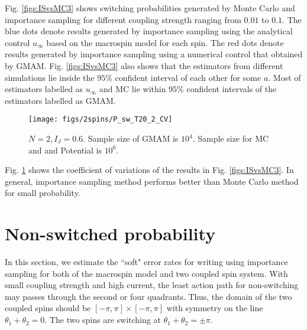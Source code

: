\documentclass[journal,transmag]{IEEEtran}
\begin{document}
Fig. \ref{figs:ISvsMC3} shows switching probabilities generated by Monte Carlo and importance sampling for different coupling strength ranging from $0.01$ to $0.1$. The blue dots denote results generated by importance sampling using the analytical control $u_{\infty}$  based on the macrospin model for each spin. The red dots denote results generated by importance sampling using a numerical control that obtained by GMAM.
 Fig. \ref{figs:ISvsMC3} also shows that the estimators from different simulations lie inside the $95\%$ confident interval of each other for some $a$. Most of estimators labelled as $u_\infty$ and MC lie within  $95\%$ confident intervals of the estimators labelled as GMAM.

 \begin{figure}[h]
   \centering
         \texttt{[image: figs/2spins/P\_sw\_T20\_2\_CV]}
   \caption{$N = 2, I_J = 0.6$. Sample size of GMAM is $10^4$. Sample size for MC and and Potential  is $10^6$. }
      \label{figs:ISvsMC3_cv}
\end{figure}

Fig. \ref{figs:ISvsMC3_cv} shows the  coefficient of variations of the results in Fig. \ref{figs:ISvsMC3}. In general, importance sampling method performs better than Monte Carlo method for small probability.

\section{Non-switched probability}
In this section, we estimate the ``soft" error rates for writing using importance sampling for both of the macrospin model and two coupled spin system. With small coupling strength and high current, the least action path for non-switching may passes through the second or four quadrants. Thus, the domain of the two coupled spins should be $[-\pi,\pi] \times  [-\pi,\pi ]$ with symmetry on the line $ \theta_1 + \theta_2 = 0$. The two spins are switching at $ \theta_1 + \theta_2 = \pm \pi.$
\end{document}
